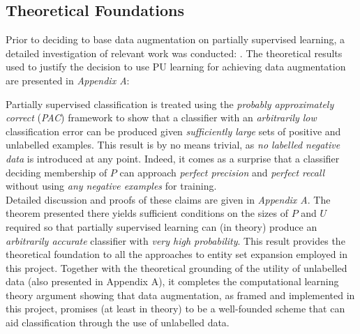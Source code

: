 \documentclass[12pt,twoside,notitlepage,amsart]{report} %
\begin{document}
	 
	
	\subsection{Theoretical Foundations} %
	
	Prior to deciding to base data augmentation on partially supervised learning, a detailed investigation of relevant work was conducted: \cite{Castelli95, Chapelle06, Letham13, Liu02, Nigam98}. The theoretical results used to justify the decision to use PU learning for achieving data augmentation are presented in \emph{Appendix A}:
	
Partially supervised classification is treated using the \emph{probably approximately correct} (\emph{PAC}) framework to show that a classifier with an \emph{arbitrarily low} classification error can be produced given \emph{sufficiently large} sets of positive and unlabelled examples. This result is by no means trivial, as \emph{no labelled negative data} is introduced at any point. Indeed, it comes as a surprise that a classifier deciding membership of $P$ can approach \emph{perfect precision} {and} \emph{perfect recall} {without} using \emph{any negative examples} for training. \\
	 
	Detailed discussion and proofs of these claims are given in \emph{Appendix A}. The theorem presented there yields sufficient conditions on the sizes of $P$ and $U$ required so that partially supervised learning can (in theory) produce an \emph{arbitrarily accurate} classifier with \emph{very high probability}. This result provides the theoretical foundation to all the approaches to entity set expansion employed in this project. Together with the theoretical grounding of the utility of unlabelled data (also presented in Appendix A), it completes the computational learning theory argument showing that data augmentation, as framed and implemented in this project, promises (at least in theory) to be a well-founded scheme that can aid classification through the use of unlabelled data.  
	
\end{document}
